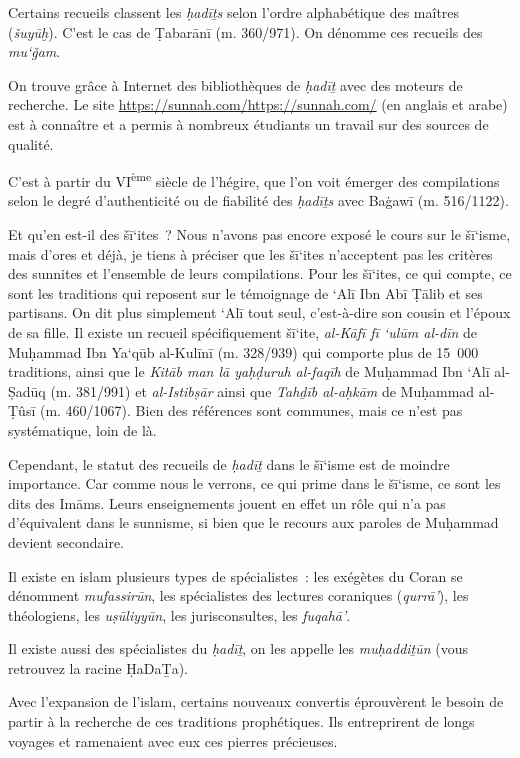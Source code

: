 Certains recueils classent les \emph{ḥadīṯs} selon l'ordre alphabétique
des maîtres (\emph{šuyūḫ}). C'est le cas de Ṭabarānī (m. 360/971). On
dénomme ces recueils des \emph{mu`ǧam}.

On trouve grâce à Internet des bibliothèques de \emph{ḥadīṯ} avec des
moteurs de recherche. Le site
\url{https://sunnah.com/}{\underline{https://sunnah.com/}} (en anglais
et arabe) est à connaître et a permis à nombreux étudiants un travail
sur des sources de qualité.

C'est à partir du VI\textsuperscript{ème} siècle de l'hégire, que l'on
voit émerger des compilations selon le degré d'authenticité ou de
fiabilité des \emph{ḥadīṯs} avec Baġawī (m. 516/1122).

Et qu'en est-il des šī`ites~? Nous n'avons pas encore exposé le cours
sur le šī`isme, mais d'ores et déjà, je tiens à préciser que les šī`ites
n'acceptent pas les critères des sunnites et l'ensemble de leurs
compilations. Pour les šī`ites, ce qui compte, ce sont les traditions
qui reposent sur le témoignage de `Alī Ibn Abī Ṭālib et ses partisans.
On dit plus simplement `Alī tout seul, c'est-à-dire son cousin et
l'époux de sa fille. Il existe un recueil spécifiquement šī`ite,
\emph{al-Kāfī fī `ulūm al-dīn} de Muḥammad Ibn Ya`qūb al-Kulīnī (m.
328/939) qui comporte plus de 15~000 traditions, ainsi que le
\emph{Kitāb man lā yaḥḍuruh al-faqīh} de Muḥammad Ibn `Alī al-Ṣadūq (m.
381/991) et \emph{al-Istibṣār} ainsi que \emph{Tahḏīb al-aḥkām} de
Muḥammad al-Ṭûsī (m. 460/1067). Bien des références sont communes, mais
ce n'est pas systématique, loin de là.

Cependant, le statut des recueils de \emph{ḥadīṯ} dans le šī`isme est de
moindre importance. Car comme nous le verrons, ce qui prime dans le
šī`isme, ce sont les dits des Imāms. Leurs enseignements jouent en effet
un rôle qui n'a pas d'équivalent dans le sunnisme, si bien que le
recours aux paroles de Muḥammad devient secondaire.


Il existe en islam plusieurs types de spécialistes~: les exégètes du
Coran se dénomment \emph{mufassirūn}, les spécialistes des lectures
coraniques (\emph{qurrā'}), les théologiens, les \emph{uṣūliyyūn}, les
jurisconsultes, les \emph{fuqahā'}. 
\begin{Def}[muḥaddiṯūn]
Il existe aussi des spécialistes du
\emph{ḥadīṯ}, on les appelle les \emph{muḥaddiṯūn} (vous retrouvez la
racine ḤaDaṮa).
\end{Def}
 Avec l'expansion de l'islam, certains nouveaux convertis
éprouvèrent le besoin de partir à la recherche de ces traditions
prophétiques. Ils entreprirent de longs voyages et ramenaient avec eux
ces pierres précieuses.

